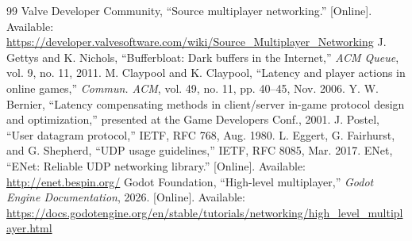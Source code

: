 \IfFileExists{IEEEtran.cls}{\ieeetrue\documentclass[conference]{IEEEtran}}{\ieeefalse\documentclass[twocolumn,10pt]{article}}
\begin{document}
\begin{thebibliography}{99}
 Valve Developer Community, ``Source multiplayer networking.'' [Online]. Available: \url{https://developer.valvesoftware.com/wiki/Source_Multiplayer_Networking}
 J. Gettys and K. Nichols, ``Bufferbloat: Dark buffers in the Internet,'' \emph{ACM Queue}, vol. 9, no. 11, 2011.
 M. Claypool and K. Claypool, ``Latency and player actions in online games,'' \emph{Commun. ACM}, vol. 49, no. 11, pp. 40--45, Nov. 2006.
 Y. W. Bernier, ``Latency compensating methods in client/server in-game protocol design and optimization,'' presented at the Game Developers Conf., 2001.
 J. Postel, ``User datagram protocol,'' IETF, RFC 768, Aug. 1980.
 L. Eggert, G. Fairhurst, and G. Shepherd, ``UDP usage guidelines,'' IETF, RFC 8085, Mar. 2017.
 ENet, ``ENet: Reliable UDP networking library.'' [Online]. Available: \url{http://enet.bespin.org/} %
 Godot Foundation, ``High-level multiplayer,'' \emph{Godot Engine Documentation}, 2026. [Online]. Available: \url{https://docs.godotengine.org/en/stable/tutorials/networking/high_level_multiplayer.html} %
\end{thebibliography}
\end{document}

